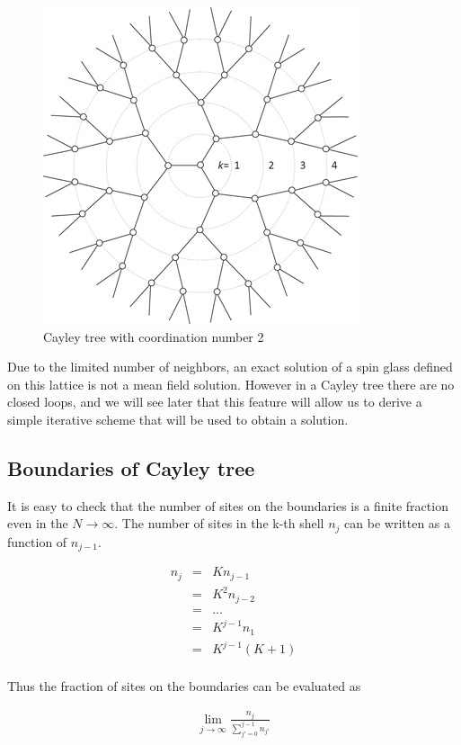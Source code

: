 \begin{figure}[h]
\noindent
		\includegraphics[scale =0.7]{img/cayley.jpg}
	\caption{Cayley tree with coordination number 2}
	\label{fig:cayley}
\end{figure}


Due to the limited number of neighbors, an exact solution of a spin glass defined on this lattice is not a mean field solution.
However in a Cayley tree there are no closed loops, and we will see later that this feature will allow us to derive a simple iterative scheme that will be used to obtain a solution.


\subsection{Boundaries of Cayley tree}

It is easy to check that the number of sites on the boundaries is a finite fraction even in the $N \rightarrow \infty$. The number of sites in the k-th shell $n_j$ can be written as a function of $n_{j-1}$.

\begin{eqnarray}
n_{j} &=& Kn_{j-1} \nonumber\\
      &=& K^2n_{j-2} \nonumber\\
		&=& ... \nonumber\\
		&=& K^{j-1}n_1 \nonumber\\
		&=& K^{j-1}(K+1) \nonumber\\
\end{eqnarray}

Thus the fraction of sites on the boundaries can be evaluated as

\begin{eqnarray}
\lim_{j\rightarrow\infty} \frac{n_{j}}{\sum_{j'=0}^{j-1} n_{j'}}
\end{eqnarray}

